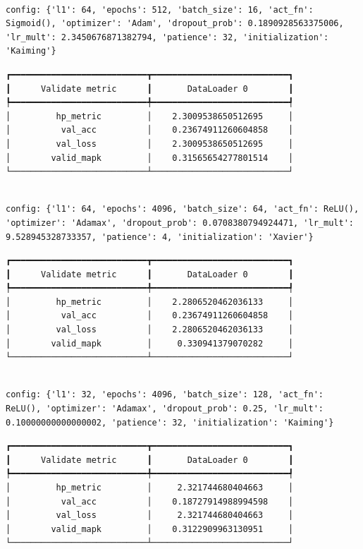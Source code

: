 \documentclass[
  letterpaper,
  DIV=11,
  numbers=noendperiod]{scrreprt}
\begin{document}
\begin{verbatim}

config: {'l1': 64, 'epochs': 512, 'batch_size': 16, 'act_fn': Sigmoid(), 'optimizer': 'Adam', 'dropout_prob': 0.1890928563375006, 'lr_mult': 2.3450676871382794, 'patience': 32, 'initialization': 'Kaiming'}
\end{verbatim}

\begin{verbatim}
┏━━━━━━━━━━━━━━━━━━━━━━━━━━━┳━━━━━━━━━━━━━━━━━━━━━━━━━━━┓
┃      Validate metric      ┃       DataLoader 0        ┃
┡━━━━━━━━━━━━━━━━━━━━━━━━━━━╇━━━━━━━━━━━━━━━━━━━━━━━━━━━┩
│         hp_metric         │    2.3009538650512695     │
│          val_acc          │    0.23674911260604858    │
│         val_loss          │    2.3009538650512695     │
│        valid_mapk         │    0.31565654277801514    │
└───────────────────────────┴───────────────────────────┘
\end{verbatim}

\begin{verbatim}

config: {'l1': 64, 'epochs': 4096, 'batch_size': 64, 'act_fn': ReLU(), 'optimizer': 'Adamax', 'dropout_prob': 0.0708380794924471, 'lr_mult': 9.528945328733357, 'patience': 4, 'initialization': 'Xavier'}
\end{verbatim}

\begin{verbatim}
┏━━━━━━━━━━━━━━━━━━━━━━━━━━━┳━━━━━━━━━━━━━━━━━━━━━━━━━━━┓
┃      Validate metric      ┃       DataLoader 0        ┃
┡━━━━━━━━━━━━━━━━━━━━━━━━━━━╇━━━━━━━━━━━━━━━━━━━━━━━━━━━┩
│         hp_metric         │    2.2806520462036133     │
│          val_acc          │    0.23674911260604858    │
│         val_loss          │    2.2806520462036133     │
│        valid_mapk         │     0.330941379070282     │
└───────────────────────────┴───────────────────────────┘
\end{verbatim}

\begin{verbatim}

config: {'l1': 32, 'epochs': 4096, 'batch_size': 128, 'act_fn': ReLU(), 'optimizer': 'Adamax', 'dropout_prob': 0.25, 'lr_mult': 0.10000000000000002, 'patience': 32, 'initialization': 'Kaiming'}
\end{verbatim}

\begin{verbatim}
┏━━━━━━━━━━━━━━━━━━━━━━━━━━━┳━━━━━━━━━━━━━━━━━━━━━━━━━━━┓
┃      Validate metric      ┃       DataLoader 0        ┃
┡━━━━━━━━━━━━━━━━━━━━━━━━━━━╇━━━━━━━━━━━━━━━━━━━━━━━━━━━┩
│         hp_metric         │     2.321744680404663     │
│          val_acc          │    0.18727914988994598    │
│         val_loss          │     2.321744680404663     │
│        valid_mapk         │    0.3122909963130951     │
└───────────────────────────┴───────────────────────────┘
\end{verbatim}
\end{document}

